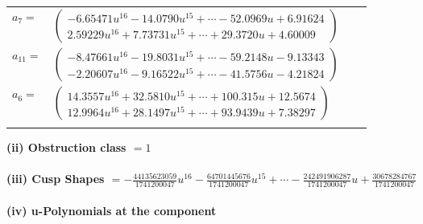 \documentclass[1p]{elsarticle_modified}
\theoremstyle{definition}
\begin{document}
\begin{tabular}{m{7pt} m{180pt} m{7pt} m{180pt} }
\flushright $a_{7}=$&$\begin{pmatrix}-6.65471 u^{16}-14.0790 u^{15}+\cdots-52.0969 u+6.91624\\2.59229 u^{16}+7.73731 u^{15}+\cdots+29.3720 u+4.60009\end{pmatrix}$ \\
\flushright $a_{11}=$&$\begin{pmatrix}-8.47661 u^{16}-19.8031 u^{15}+\cdots-59.2148 u-9.13343\\-2.20607 u^{16}-9.16522 u^{15}+\cdots-41.5756 u-4.21824\end{pmatrix}$ \\
\flushright $a_{6}=$&$\begin{pmatrix}14.3557 u^{16}+32.5810 u^{15}+\cdots+100.315 u+12.5674\\12.9964 u^{16}+28.1497 u^{15}+\cdots+93.9439 u+7.38297\end{pmatrix}$\\&\end{tabular}
\flushleft \textbf{(ii) Obstruction class $= 1$}\\~\\
\flushleft \textbf{(iii) Cusp Shapes $= -\frac{44135623059}{1741200047} u^{16}-\frac{64701445676}{1741200047} u^{15}+\cdots-\frac{242491906287}{1741200047} u+\frac{30678284767}{1741200047}$}\\~\\
\newpage\renewcommand{\arraystretch}{1}
\flushleft \textbf{(iv) u-Polynomials at the component}\newline \\
\end{document}
